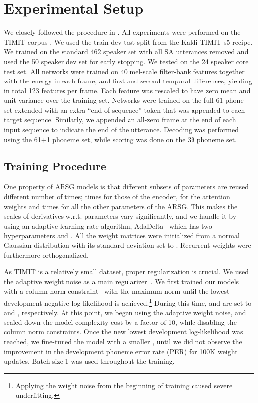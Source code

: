 \documentclass{article}
\begin{document}
\section{Experimental Setup}
\label{sec:setup}

We closely followed the procedure in \cite{graves_2013_timit}. All experiments
were performed on the TIMIT corpus \cite{timit}. We used the train-dev-test
split from the Kaldi \cite{povey_2011} TIMIT s5 recipe. We trained on the
standard 462 speaker set with all SA utterances removed and used the 50 speaker
dev set for early stopping. We tested on the 24 speaker core test set. All
networks were trained on 40 mel-scale filter-bank features together with the
energy in each frame, and first and second temporal differences, yielding in
total 123 features per frame. Each feature was rescaled to have zero mean and
unit variance over the training set. Networks were trained on the full 61-phone
set extended with an extra ``end-of-sequence'' token that was appended to each
target sequence. Similarly, we appended an all-zero frame at the end of each
input sequence to indicate the end of the utterance. Decoding was performed
using the 61+1 phoneme set, while scoring was done on the 39 phoneme set.

\subsection{Training Procedure}

One property of ARSG models is that different subsets of parameters are reused
different number of times;  times for those of the encoder,  for the
attention weights and  times for all the other parameters of the ARSG.  This
makes the scales of derivatives w.r.t. parameters vary significantly, and we
handle it by using an adaptive learning rate algorithm,
AdaDelta~\cite{zeiler_2012} which has two hyperparameters  and .
All the weight matrices were initialized from a normal Gaussian distribution
with its standard deviation set to . Recurrent weights were furthermore
orthogonalized.



As TIMIT is a relatively small dataset, proper regularization is crucial. We used
the adaptive weight noise as a main regularizer~\cite{graves_2011}.  We first
trained our models with a column norm constraint~\cite{hinton_2012} with the
maximum norm 
until the lowest development negative log-likelihood is achieved.\footnote{
    Applying the weight noise from the beginning of training caused severe
    underfitting.
}
During this time,  and  are set to  and ,
respectively.  At this point, we began using the adaptive weight noise, and
scaled down the model complexity cost  by a factor of 10, while disabling
the column norm constraints. Once
the new lowest development log-likelihood was reached, we fine-tuned the model
with a smaller , until we did
not observe the improvement in the development phoneme error rate (PER) for 100K
weight updates. Batch size 1 was used throughout the
training.
\end{document}
